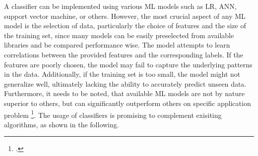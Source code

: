 A classifier can be implemented using various \gls{ML} models such as \gls{LR},
\gls{ANN}, support vector machine, or others. However, the most crucial aspect of any
\gls{ML} model is the selection of data, particularly the choice of features and
the size of the training set, since many models can be easily preselected from available
libraries and be compared performance wise. The model attempts to learn correlations between the provided features
and the corresponding labels. If the features are poorly chosen, the model may fail
to capture the underlying patterns in the data. Additionally, if the training set
is too small, the model might not generalize well, ultimately lacking the ability
to accurately predict unseen data. Furthermore, it needs to be noted, that available
\gls{ML} models are not by nature superior to others, but can significantly outperform
others on specific application problem \footcite[cf.][pp. 250, 264]{kotsiantis_supervised_2007}.
The usage of classifiers is promising to complement exisiting algorithms, as shown in the following.

